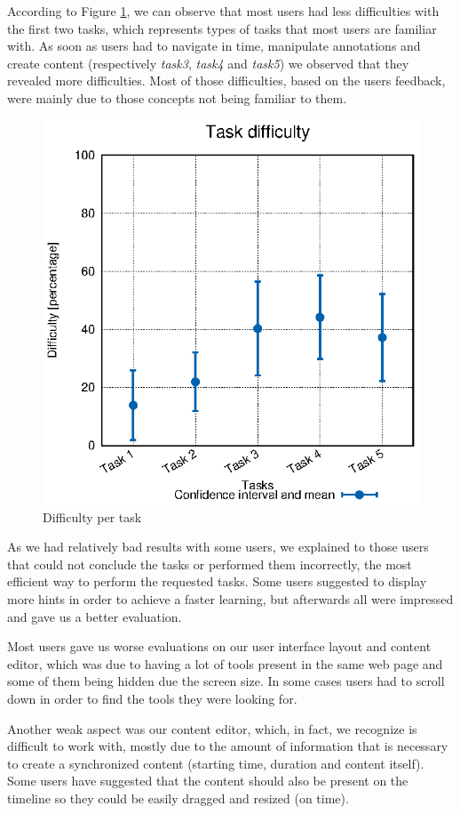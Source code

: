 \documentclass[10pt,conference]{IEEEtran}
\begin{document}
According to Figure \ref{fig:user_diffs}, we can observe that most users had less difficulties with the first two tasks, which represents types of tasks that most users are familiar with. As soon as users had to navigate in time, manipulate annotations and create content (respectively \emph{task3}, \emph{task4} and \emph{task5}) we observed that they revealed more difficulties. Most of those difficulties, based on the users feedback, were mainly due to those concepts not being familiar to them.



\begin{figure}
  \centering
    \includegraphics[width=0.8\linewidth]{stats/user_diffs.eps}
  \caption{Difficulty per task}
  \label{fig:user_diffs}
\end{figure}


As we had relatively bad results with some users, we explained to those users that could not conclude the tasks or performed them incorrectly, the most efficient way to perform the requested tasks. Some users suggested to display more hints in order to achieve a faster learning, but afterwards all were impressed and gave us a better evaluation.

Most users gave us worse evaluations on our user interface layout and content editor, which was due to having a lot of tools present in the same web page and some of them being hidden due the screen size. In some cases users had to scroll down in order to find the tools they were looking for. 

Another weak aspect was our content editor, which, in fact, we recognize is difficult to work with, mostly due to the amount of information that is necessary to create a synchronized content (starting time, duration and content itself). Some users have suggested that the content should also be present on the timeline so they could be easily dragged and resized (on time).
\end{document}
